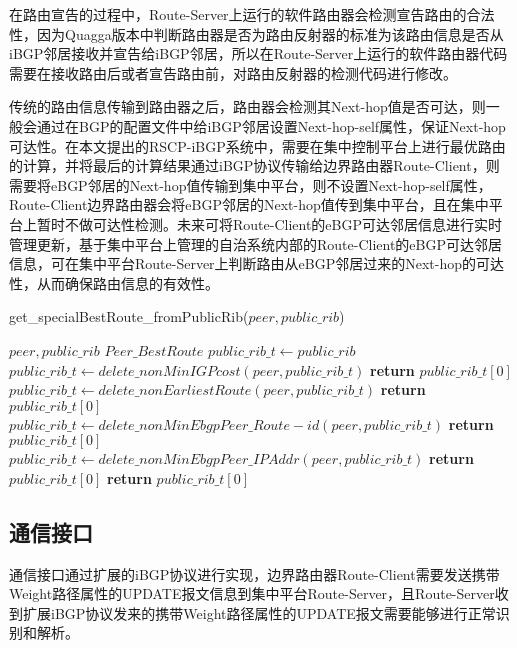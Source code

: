 在路由宣告的过程中，Route-Server上运行的软件路由器会检测宣告路由的合法性，因为Quagga版本中判断路由器是否为路由反射器的标准为该路由信息是否从iBGP邻居接收并宣告给iBGP邻居，所以在Route-Server上运行的软件路由器代码需要在接收路由后或者宣告路由前，对路由反射器的检测代码进行修改。

传统的路由信息传输到路由器之后，路由器会检测其Next-hop值是否可达，则一般会通过在BGP的配置文件中给iBGP邻居设置Next-hop-self属性，保证Next-hop可达性。在本文提出的RSCP-iBGP系统中，需要在集中控制平台上进行最优路由的计算，并将最后的计算结果通过iBGP协议传输给边界路由器Route-Client，则需要将eBGP邻居的Next-hop值传输到集中平台，则不设置Next-hop-self属性，Route-Client边界路由器会将eBGP邻居的Next-hop值传到集中平台，且在集中平台上暂时不做可达性检测。未来可将Route-Client的eBGP可达邻居信息进行实时管理更新，基于集中平台上管理的自治系统内部的Route-Client的eBGP可达邻居信息，可在集中平台Route-Server上判断路由从eBGP邻居过来的Next-hop的可达性，从而确保路由信息的有效性。

\begin{algorithm}[!h]
    \caption{get\_specialBestRoute\_fromPublicRib($peer,public\_rib$)}
    \label{alg:public selection_two}
    \begin{algorithmic}[1]%
         \REQUIRE
        $peer,public\_rib$
        \ENSURE
        $Peer\_BestRoute$
        \STATE $public\_rib\_t \gets public\_rib$
        \STATE $public\_rib\_t \gets delete\_nonMinIGPcost(peer, public\_rib\_t)$
        \STATE \textbf{return} $public\_rib\_t[0]$
        \ENDIF
        \STATE $public\_rib\_t \gets delete\_nonEarliestRoute(peer, public\_rib\_t)$
        \STATE \textbf{return} $public\_rib\_t[0]$
        \ENDIF
        \STATE $public\_rib\_t \gets delete\_nonMinEbgpPeer\_Route-id(peer, public\_rib\_t)$
        \STATE \textbf{return} $public\_rib\_t[0]$
        \ENDIF
        \STATE $public\_rib\_t \gets delete\_nonMinEbgpPeer\_IPAddr(peer, public\_rib\_t)$
        \STATE \textbf{return} $public\_rib\_t[0]$
        \ENDIF
        \STATE \textbf{return} $public\_rib\_t[0]$
    \end{algorithmic}
\end{algorithm}


\subsection{通信接口}
通信接口通过扩展的iBGP协议进行实现，边界路由器Route-Client需要发送携带Weight路径属性的UPDATE报文信息到集中平台Route-Server，且Route-Server收到扩展iBGP协议发来的携带Weight路径属性的UPDATE报文需要能够进行正常识别和解析。

